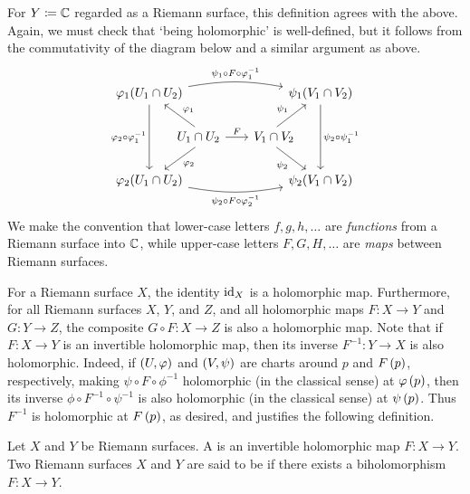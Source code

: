 \documentclass[../Moduli_Spaces_of_Riemann_Surfaces.tex]{subfiles}
\begin{document}
    \begin{remark}
        For $Y\coloneqq\mathbb{C}$ regarded as a Riemann surface, this definition agrees with the above. Again, we must check that $\textrm{`}$being holomorphic$\textrm{'}$ is well-defined, but it follows from the commutativity of the diagram below and a similar argument as above.
        \begin{equation*}
            \begin{tikzcd}[column sep = 0.05in]
                \phi_1\!\l(U_1\cap U_2\r) \ar[rrrrrrr, "\psi_1\circ F\circ\phi_1^{-1}", bend left = 10] \ar[dd, "\phi_2\circ\phi_1^{-1}"'] & & & & & & & \psi_1\!\l(V_1\cap V_2\r) \ar[dd, "\psi_2\circ\psi_1^{-1}"] \\
                & \hspace{-0.23in}U_1\cap U_2 \ar[ul, "\phi_1"'] \ar [dl, "\phi_2"] \ar[rrrrr, "F"] & & & & & V_1\cap V_2\hspace{-0.23in} \ar[ur, "\psi_1"] \ar[dr, "\psi_2"'] \\
                \phi_2\!\l(U_1\cap U_2\r) \ar[rrrrrrr, "\psi_2\circ F\circ\phi_2^{-1}"', bend right = 10] & & & & & & & \psi_2\!\l(V_1\cap V_2\r)
            \end{tikzcd}
        \end{equation*}
        We make the convention that lower-case letters $f,g,h,\dots$ are \textit{functions} from a Riemann surface into $\mathbb{C}$, while upper-case letters $F,G,H,\dots$ are \textit{maps} between Riemann surfaces.\exqed
    \end{remark}
    \begin{example}
        For a Riemann surface $X$, the identity $\operatorname{id}_X$ is a holomorphic map. Furthermore, for all Riemann surfaces $X$, $Y$, and $Z$, and all holomorphic maps $F:X\to Y$ and $G:Y\to Z$, the composite $G\circ F:X\to Z$ is also a holomorphic map. Note that if $F:X\to Y$ is an invertible holomorphic map, then its inverse $F^{-1}:Y\to X$ is also holomorphic. Indeed, if $\left(U,\varphi\right)$ and $\left(V,\psi\right)$ are charts around $p$ and $F\left(p\right)$, respectively, making $\psi\circ F\circ\phi^{-1}$ holomorphic (in the classical sense) at $\varphi\left(p\right)$, then its inverse $\phi\circ F^{-1}\circ\psi^{-1}$ is also holomorphic (in the classical sense) at $\psi\left(p\right)$. Thus $F^{-1}$ is holomorphic at $F\left(p\right)$, as desired, and justifies the following definition.\exqed
    \end{example}
    \begin{definition}\label{RS:def:biholomorphic_Riemann_surfaces}
        Let $X$ and $Y$ be Riemann surfaces. A  is an invertible holomorphic map $F:X\to Y$. Two Riemann surfaces $X$ and $Y$ are said to be  if there exists a biholomorphism $F:X\to Y$.
    \end{definition}
\end{document}
